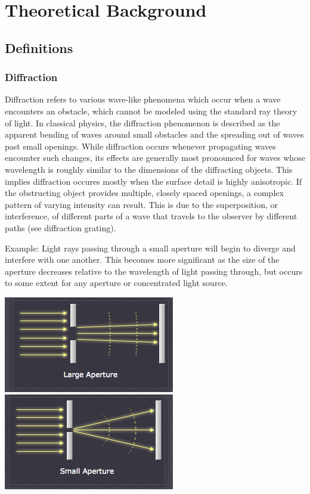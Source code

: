 \section{Theoretical Background}
\subsection{Definitions}
\subsubsection{Diffraction}
Diffraction refers to various wave-like phenomena which occur when a wave encounters an obstacle, which cannot be modeled using the standard ray theory of light. 
In classical physics, the diffraction phenomenon is described as the apparent bending of waves around small obstacles and the spreading out of waves past small openings.
While diffraction occurs whenever propagating waves encounter such changes, its effects are generally most pronounced for waves whose wavelength is roughly similar to the dimensions of the diffracting objects. This implies diffraction occures mostly when the surface detail is highly anisotropic. If the obstructing object provides multiple, closely spaced openings, a complex pattern of varying intensity can result. This is due to the superposition, or interference, of different parts of a wave that travels to the observer by different paths (see diffraction grating).

Example:
Light rays passing through a small aperture will begin to diverge and interfere with one another. This becomes more significant as the size of the aperture decreases relative to the wavelength of light passing through, but occurs to some extent for any aperture or concentrated light source.

\includegraphics[scale=0.5]{images/1.png}
\includegraphics[scale=0.5]{images/2.png}

